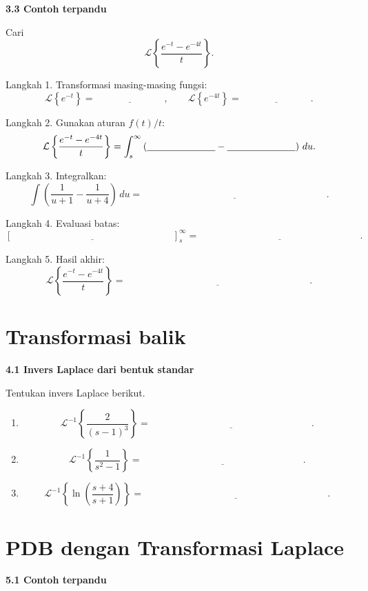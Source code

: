 \documentclass[11pt,a4paper]{article}
\newcommand{\Lcal}{\mathcal{L}}
\newcommand{\Lap}[1]{\Lcal\left\{#1\right\}}
\newcommand{\invLap}[1]{\Lcal^{-1}\left\{#1\right\}}
\newcommand{\stepbox}[1]{\vspace{0.2cm}\colorbox{iteraLight}{\parbox{0.98\linewidth}{\textbf{#1}}}\vspace{0.15cm}}
\begin{document}
\stepbox{3.3 Contoh terpandu}

Cari
\[
\Lap{\frac{e^{-t}-e^{-4t}}{t}}.
\]

Langkah 1. Transformasi masing-masing fungsi:
\[
\Lap{e^{-t}}=\underline{\hspace{3cm}},
\qquad
\Lap{e^{-4t}}=\underline{\hspace{3cm}}.
\]

Langkah 2. Gunakan aturan $f(t)/t$:
\[
\Lap{\frac{e^{-t}-e^{-4t}}{t}}
=
\int_s^\infty
\left(
\underline{\hspace{2.5cm}}
-
\underline{\hspace{2.5cm}}
\right)\,du.
\]

Langkah 3. Integralkan:
\[
\int
\left(
\frac{1}{u+1}-\frac{1}{u+4}
\right)\,du
=
\underline{\hspace{8cm}}.
\]

Langkah 4. Evaluasi batas:
\[
\left[
\underline{\hspace{7cm}}
\right]_s^\infty
=
\underline{\hspace{7cm}}.
\]

Langkah 5. Hasil akhir:
\[
\Lap{\frac{e^{-t}-e^{-4t}}{t}}
=
\underline{\hspace{8cm}}.
\]

\section{Transformasi balik}
\stepbox{4.1 Invers Laplace dari bentuk standar}

Tentukan invers Laplace berikut.

\begin{enumerate}
    \item
    \[
    \invLap{\frac{2}{(s-1)^3}}=\underline{\hspace{7cm}}.
    \]

    \item
    \[
    \invLap{\frac{1}{s^2-1}}=\underline{\hspace{7cm}}.
    \]

    \item
    \[
    \invLap{\ln\left(\frac{s+4}{s+1}\right)}
    =
    \underline{\hspace{8cm}}.
    \]
\end{enumerate}

\section{PDB dengan Transformasi Laplace}
\stepbox{5.1 Contoh terpandu}
\end{document}
